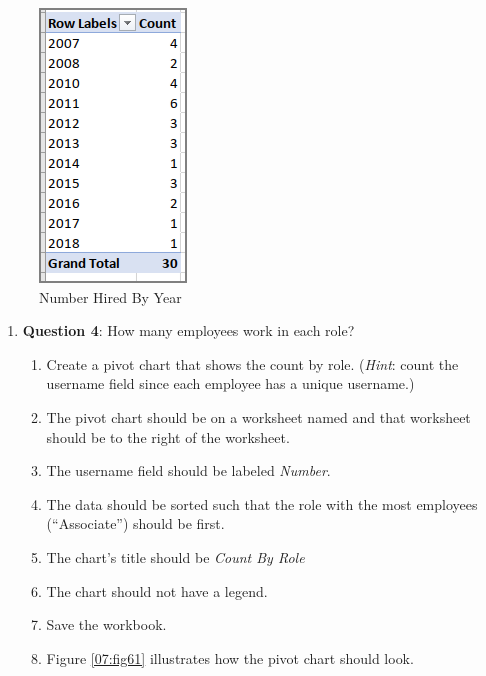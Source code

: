\begin{figure}[H]
	\centering
	\includegraphics[width=\maxwidth{.95\linewidth}]{gfx/ch07_fig60}
	\caption{Number Hired By Year}
	\label{07:fig60}
\end{figure}

\begin{enumerate}[resume]
	\item{\textbf{Question 4}: How many employees work in each role?}
	
	\begin{enumerate}
		\item Create a pivot chart that shows the count by role. (\textit{Hint}: count the username field since each employee has a unique username.)
		\item The pivot chart should be on a worksheet named  and that worksheet should be to the right of the  worksheet.
		\item The username field should be labeled \textit{Number}.
		\item The data should be sorted such that the role with the most employees (``Associate'') should be first.
		\item The chart's title should be \textit{Count By Role}
		\item The chart should not have a legend.
		\item Save the workbook.
		\item Figure \ref{07:fig61} illustrates how the pivot chart should look.
	\end{enumerate}
	
\end{enumerate}

